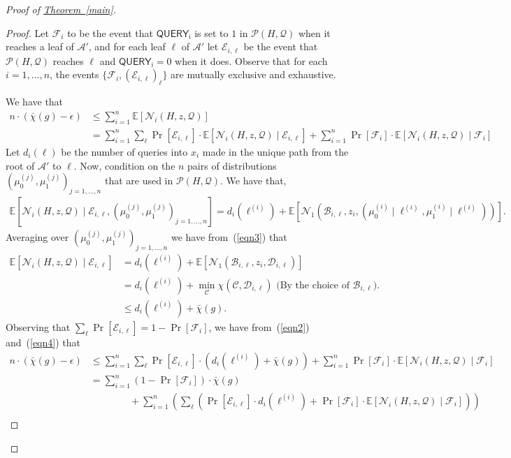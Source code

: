 \documentclass[11pt]{article}
\numberwithin{equation}{section}
\theoremstyle{definition}
\theoremstyle{plain}
\newcommand{\expref}[2]{\hyperref[#2]{#1~\ref{#2}}}
\newcommand{\cA}{\mathcal{A}}
\newcommand{\clB}{\mathcal{B}}
\newcommand{\clC}{\mathcal{C}}
\newcommand{\clE}{\mathcal{E}}
\newcommand{\clQ}{\mathcal{Q}}
\newcommand{\clP}{\mathcal{P}}
\newcommand{\clN}{\mathcal{N}}
\newcommand{\clD}{\mathcal{D}}
\newcommand{\E}{\mathbb{E}}
\begin{document}
\begin{proof}[Proof of {\expref{Theorem}{main}}]
\begin{proof}
Let $\mathcal{F}_i$ to be the event that $\mathsf{QUERY_i}$ is set to $1$ in $\clP(H,\clQ)$ when it reaches a leaf of $\cA'$, and for each leaf $\ell$ of $\cA'$ let $\mathcal{E}_{i, \ell}$ be the event that $\clP(H,\clQ)$ reaches $\ell$ and 
$\mathsf{QUERY_i}=0$ when it does.   Observe that for each $i=1, \ldots, n$, the events $\{\mathcal{F}_i, (\mathcal{E}_{i,\ell})_{\ell}\}$ are mutually exclusive and exhaustive.  

We have that
\begin{align}
n \cdot (\bar \chi(g)-\epsilon) &\leq \sum_{i=1}^n\E[\clN_i(H,z,\clQ)] \nonumber \\
&=\sum_{i=1}^n\sum_{\ell}\Pr[\clE_{i,\ell}]\cdot \E[\clN_i(H,z,\clQ) \mid \clE_{i,\ell}]+\sum_{i=1}^n\Pr[\mathcal{F}_i]\cdot \E[\clN_i(H,z,\clQ) \mid \mathcal{F}_i] \label{eqn2}
\end{align}
Let $d_i(\ell)$ be the number of queries into $x_i$ made in the unique path from the root of $\cA'$ to $\ell$.
Now, condition on the $n$ pairs of distributions $(\mu_0^{(j)}, \mu_1^{(j)})_{j=1, \ldots, n}$ that are used in $\clP(H,\clQ)$.  We have that,
\begin{align}
\E[\clN_i(H,z,\clQ) \mid \clE_{i,\ell}, (\mu_0^{(j)}, \mu_1^{(j)})_{j=1, \ldots, n}]=d_i(\ell^{(i)})+\E[\clN_1(\clB_{i,\ell},z_i,(\mu_0^{(i)}\mid \ell^{(i)}, \mu_1^{(i)} \mid \ell^{(i)}))].\label{eqn3}
\end{align}
Averaging over $(\mu_0^{(j)}, \mu_1^{(j)})_{j=1, \ldots, n}$ we have from~(\ref{eqn3}) that
\begin{align}
\E[\clN_i(H,z,\clQ) \mid \clE_{i,\ell}] &= d_i(\ell^{(i)})+\E[\clN_1(\clB_{i,\ell},z_i,\clD_{i,\ell})]\nonumber \\
&= d_i(\ell^{(i)})+\min_{\clC}\chi(\clC, \clD_{i,\ell})\mbox{\ \ \ \ (By the choice of $\clB_{i,\ell}$)}. \nonumber \\
&\leq d_i(\ell^{(i)})+\bar \chi(g).\label{eqn4}
\end{align}
Observing that $\sum_{\ell}\Pr[\clE_{i, \ell}]=1-\Pr[\mathcal{F}_i]$, we have from~(\ref{eqn2}) and~(\ref{eqn4}) that
\begin{align}
n\cdot (\bar \chi(g)-\epsilon) &\leq  \sum_{i=1}^n \sum_{\ell}\Pr[\clE_{i, \ell}] \cdot (d_i(\ell^{(i)})+\bar \chi(g)) + \sum_{i=1}^n\Pr[\mathcal{F}_i]\cdot\E[\clN_i(H,z,\clQ) \mid \mathcal{F}_i]\nonumber \\
&= \sum_{i=1}^n (1-\Pr[\mathcal{F}_i]) \cdot \bar \chi(g)\nonumber \\
&\qquad \qquad +\sum_{i=1}^n\left(\sum_{\ell}(\Pr[\clE_{i,\ell}]\cdot d_i(\ell^{(i)})+\Pr[\mathcal{F}_i]\cdot \E[\clN_i(H,z,\clQ) \mid \mathcal{F}_i])\right) \nonumber \\

\end{align}
\end{proof}
\end{proof}
\end{document}
